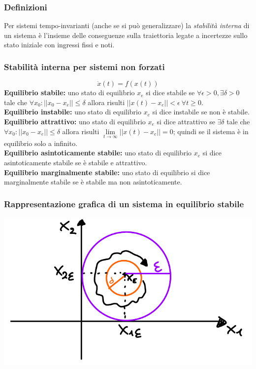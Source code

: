 \documentclass{article}
\numberwithin{equation}{subsection}
\begin{document}
\subsubsection{Definizioni}
Per sistemi tempo-invarianti (anche se si può generalizzare) la \textit{stabilità interna} di un sistema è l'insieme delle conseguenze sulla traiettoria legate a incertezze sullo stato iniziale con ingressi fissi e noti.


\subsubsection{Stabilità interna per sistemi non forzati}
\begin{equation}
    \dot x(t) = f(x(t)) \tag*{$x_e$ equilibrio}  
\end{equation}
\textbf{Equilibrio stabile:} uno stato di equilibrio $x_e$ si dice stabile se $\forall \epsilon >0, \exists \delta >0$ tale che $\forall x_0 : || x_0-x_e || \leq \delta$ allora risulti $ || x(t) - x_e || < \epsilon \ \forall t \geq 0$. 
\vspace*{0.2cm}\\
\textbf{Equilibrio instabile:} uno stato di equilibrio $x_e$ si dice instabile se non è stabile.
\vspace*{0.2cm}\\
\textbf{Equilibrio attrattivo:} uno stato di equilibrio $x_e$ si dice  attrattivo se $\exists \delta$ tale che $\forall x_0: || x_0-x_e || \leq \delta$ allora risulti $\lim\limits_{t \rightarrow \infty} || x(t)-x_e ||=0$; quindi se il sistema è in equilibrio solo a infinito.
\vspace*{0.2cm}\\
\textbf{Equilibrio asintoticamente stabile:} uno stato di equilibrio $x_e$ si dice asintoticamente stabile se è stabile e attrattivo.
\vspace*{0.2cm}\\
\textbf{Equilibrio marginalmente stabile:} uno stato di equilibrio si dice marginalmente stabile se è stabile ma non asintoticamente.

\subsubsection*{Rappresentazione grafica di un sistema in equilibrio stabile}
\begin{center}
    \includegraphics[scale=0.3]{Images/Equilibrio_stabile.png}
\end{center}
\end{document}
